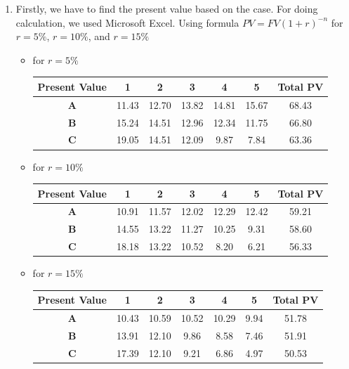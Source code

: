\documentclass{article}
\begin{document}
\begin{enumerate}
		\item Firstly, we have to find the present value based on the case. For doing calculation, we used Microsoft Excel. Using formula $PV=FV(1+r)^{-n}$ for $r=5\%$, $r=10\%$, and $r=15\%$\vspace{-0.5cm}\\
		\begin{itemize}
			\item for $r=5\%$
			\begin{center}
				\begin{tabular}{|c|c|c|c|c|c|c|}
					\hline
					\textbf{Present Value }&\textbf{1}&\textbf{2}&\textbf{3}&\textbf{4}&\textbf{5}&\textbf{Total PV}\\\hline
					\textbf{A}&11.43&12.70&13.82&14.81&15.67&68.43\\\hline
					\textbf{B}&15.24&14.51&12.96&12.34&11.75&66.80\\\hline
					\textbf{C}&19.05&14.51&12.09&9.87&7.84&63.36\\\hline
				\end{tabular}
			\end{center}
			\item for $r=10\%$
			\begin{center}
				\begin{tabular}{|c|c|c|c|c|c|c|}
					\hline
					\textbf{Present Value }&\textbf{1}&\textbf{2}&\textbf{3}&\textbf{4}&\textbf{5}&\textbf{Total PV}\\\hline
					\textbf{A}&10.91&11.57&12.02&12.29&12.42&59.21\\\hline
					\textbf{B}&14.55&13.22&11.27&10.25&9.31&58.60\\\hline
					\textbf{C}&18.18&13.22&10.52&8.20&6.21&56.33\\\hline
				\end{tabular}
			\end{center}
			\item for $r=15\%$
			\begin{center}
				\begin{tabular}{|c|c|c|c|c|c|c|}
					\hline
					\textbf{Present Value }&\textbf{1}&\textbf{2}&\textbf{3}&\textbf{4}&\textbf{5}&\textbf{Total PV}\\\hline
					\textbf{A}&10.43&10.59&10.52&10.29&9.94&51.78\\\hline
					\textbf{B}&13.91&12.10&9.86&8.58&7.46&51.91\\\hline
					\textbf{C}&17.39&12.10&9.21&6.86&4.97&50.53\\\hline
				\end{tabular}

\end{center}
\end{itemize}
\end{enumerate}
\end{document}
